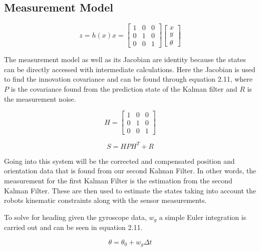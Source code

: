 \subsection{Measurement Model}

\begin{equation}
  z = h(x)x =  
  \begin{bmatrix}
    1 & 0 &  0 \\
    0 & 1 &  0 \\
    0 & 0 &  1
  \end{bmatrix}
  \begin{bmatrix}
    x \\
    y \\
    \theta
\end{bmatrix}
\end{equation}

The measurement model as well as its Jacobian are identity because the states can 
be directly accessed with intermediate calculations. Here the Jacobian is used to 
find the innovation covariance and can be found through equation 2.11, where $P$ is 
the covariance found from the prediction state of the Kalman filter and $R$ is the 
measurement noise.

\begin{equation}
  H = \begin{bmatrix}
    1 & 0 & 0 \\
    0 & 1 & 0 \\
    0 & 0 & 1
  \end{bmatrix}
\end{equation}

\begin{equation}
  S = HPH^T + R
\end{equation}

Going into this system will be the corrected and compensated position and 
orientation data that is found from our second Kalman Filter. In other words, the 
measurement for the first Kalman Filter is the estimation from the second Kalman 
Filter. These are then used to estimate the states taking into account the robots 
kinematic constraints along with the sensor measurements.  

To solve for heading given the gyroscope data, $w_g$ a simple Euler integration is carried 
out and can be seen in equation 2.11. 

\begin{equation}
  \theta = \theta_0 + w_g \Delta t
\end{equation}

